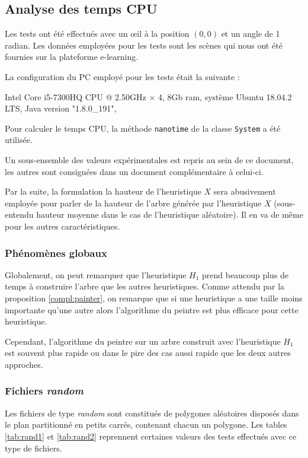 \subsection{Analyse des temps CPU}
Les tests ont été effectués avec un \oe{}il à la position $(0,0)$ et un
angle de 1 radian. Les données employées pour les tests sont les scènes
qui nous ont été fournies sur la plateforme e-learning.

La configuration du PC employé pour les tests était la suivante :

\begin{center}
  Intel Core i5-7300HQ CPU @ 2.50GHz $\times$ 4,  8Gb ram, système Ubuntu 18.04.2 LTS,
  Java version "1.8.0\_191",
\end{center}
Pour calculer le temps CPU, la méthode \texttt{nanotime} de la classe
\texttt{System} a été utilisée.

Un sous-ensemble des valeurs expérimentales est repris au sein de
ce document, les autres sont consignées dans un document complémentaire
à celui-ci.

Par la suite, la formulation \og{}la hauteur de l'heuristique
$X$\fg{} sera abusivement employée pour parler de \og{}la hauteur
de l'arbre générée par l'heuristique $X$\fg{}
(sous-entendu hauteur moyenne dans le cas de l'heuristique aléatoire).
Il en va de même pour les autres caractéristiques.

\subsubsection*{Phénomènes globaux}
Globalement, on peut remarquer que l'heuristique $H_1$ prend beaucoup plus de
temps à construire l'arbre que les autres heuristiques.
Comme attendu par la proposition \ref{compl:painter}, on remarque
que si une heuristique a une taille moins importante qu'une autre
alors l'algorithme du peintre est plus efficace pour cette heuristique.

Cependant, l'algorithme du peintre sur un arbre construit
avec l'heuristique $H_1$ est souvent plus rapide ou dans le
pire des cas aussi rapide que les deux autres approches.

\subsubsection*{Fichiers \og\emph{random}\fg}
Les fichiers de type \og\emph{random}\fg{} sont constitués de polygones
aléatoires disposés dans le plan partitionné en petits carrés, contenant
chacun un polygone. Les tables \ref{tab:rand1} et \ref{tab:rand2} reprennent
certaines valeurs des tests effectués avec ce type de fichiers.

